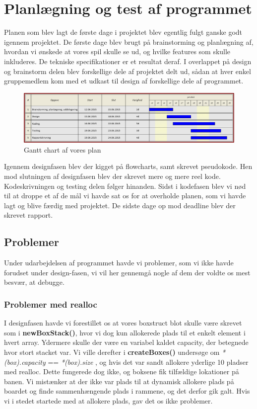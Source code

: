 \section{Planlægning og test af programmet}

Planen som blev lagt de første dage i projektet blev egentlig fulgt ganske godt igennem projektet. De første dage blev brugt på brainstorming og planlægning af, hvordan vi ønskede at vores spil skulle se ud, og hvilke features som skulle inkluderes. De tekniske specifikationer er et resultat deraf. I overlappet på design og brainstorm delen blev forskellige dele af projektet delt ud, sådan at hver enkel gruppemedlem kom med et udkast til design af forskellige dele af programmet.
\begin{figure}[h]
\begin{center}
\includegraphics[scale=0.7]{img/Gantt_Chart.png}
\caption{Gantt chart af vores plan}
\end{center}
\end{figure}
 Igennem designfasen blev der kigget på flowcharts, samt skrevet pseudokode. Hen mod slutningen af designfasen blev der skrevet mere og mere reel kode. Kodeskrivningen og testing delen følger hinanden. Sidst i kodefasen blev vi nød til at droppe et af de mål vi havde sat os for at overholde planen, som vi havde lagt og blive færdig med projektet.  De sidste dage op mod deadline blev der skrevet rapport.
\subsection{Problemer}
Under udarbejdelsen af programmet havde vi problemer, som vi ikke havde forudset under design-fasen, vi vil her gennemgå nogle af dem der voldte os mest besvær, at debugge.
\subsubsection{Problemer med realloc}
\label{reallocfejl}
I designfasen havde vi forestillet os at vores boxstruct blot skulle være skrevet som i \textbf{newBoxStack()}, hvor vi dog kun allokerede plads til et enkelt element i hvert array. Ydermere skulle der være en variabel kaldet capacity, der betegnede hvor stort stacket var. Vi ville derefter i \textbf{createBoxes()} undersøge om \textit{*(box).capacity} == \textit{*(box).size} , og hvis det var sandt allokere yderlige 10 pladser med realloc. Dette fungerede dog ikke, og boksene fik tilfældige lokationer på banen. Vi mistænker at der ikke var plads til at dynamisk allokere plads på boardet og finde sammenhængende plads i rammene, og det derfor gik galt. Hvis vi i stedet startede med at allokere plads, gav det os ikke problemer.
